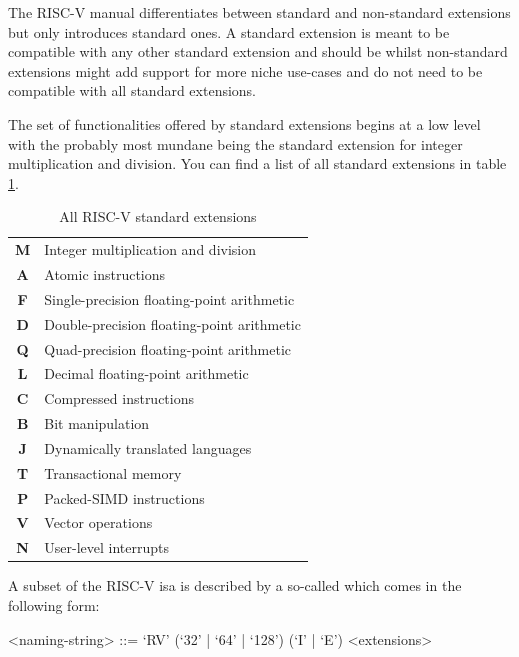 The RISC-V manual differentiates between standard and non-standard extensions but only introduces standard ones.
A standard extension is meant to be compatible with any other standard extension and should be  whilst non-standard extensions might add support for more niche use-cases and do not need to be compatible with all standard extensions.

The set of functionalities offered by standard extensions begins at a low level with the probably most mundane being the standard extension for integer multiplication and division.
You can find a list of all standard extensions in table \ref{tbl:rv-exts}.

\begin{table}
    \centering
    \begin{tabular}{| c | l |}
        \hline
        \textbf{M} & Integer multiplication and division \\
        \textbf{A} & Atomic instructions \\
        \textbf{F} & Single-precision floating-point arithmetic \\
        \textbf{D} & Double-precision floating-point arithmetic \\
        \textbf{Q} & Quad-precision floating-point arithmetic \\
        \textbf{L} & Decimal floating-point arithmetic \\
        \textbf{C} & Compressed instructions \\
        \textbf{B} & Bit manipulation \\
        \textbf{J} & Dynamically translated languages \\
        \textbf{T} & Transactional memory \\
        \textbf{P} & Packed-SIMD instructions \\
        \textbf{V} & Vector operations \\
        \textbf{N} & User-level interrupts \\
        \hline
    \end{tabular}
    \caption{All RISC-V standard extensions}
    \label{tbl:rv-exts}
\end{table}

A subset of the RISC-V \gls{isa} is described by a so-called  which comes in the following form:

\begin{grammar}
    <naming-string> ::= `RV' (`32' | `64' | `128') (`I' | `E') <extensions>
\end{grammar}

